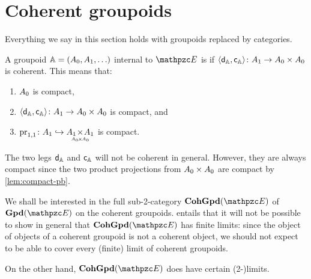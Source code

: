\documentclass[a4paper,11pt]{amsart}
\newcommand{\kpdcincat}[1]{\argpdf{#1}\hspace{-2ex}\underset{\mbox{\tiny$\obgpdf{#1}\!\!\times\!\!\obgpdf{#1}$}}{\times}\hspace{-2ex}\argpdf{#1}}
\newcommand{\Akpdcin}{\kpdcincat{A}}
\begin{document}
\section{Coherent groupoids}
\label{sec:coh-gpd}

Everything we say in this section holds with groupoids replaced by categories.

A groupoid $\mathbb{A}=({A}_0,{A}_1,\ldots)$ internal to $\Ecat$ is  if $\langle{\mathsf{d}_{\mathbb{A}},\mathsf{c}_{\mathbb{A}}}\rangle\colon {A}_1\to {A}_0\times{A}_0$ is coherent.
This means that:
\begin{enumerate}
	\item
	${A}_0$ is compact,
	\item
	$\langle{\mathsf{d}_{\mathbb{A}},\mathsf{c}_{\mathbb{A}}}\rangle\colon {A}_1\to {A}_0\times{A}_0$ is compact, and
	\item
	$\pr{1,1}\colon \Aargpdf \mono \Akpdcin$ is compact.
\end{enumerate}

The two legs $\mathsf{d}_{\mathbb{A}}$ and $\mathsf{c}_{\mathbb{A}}$ will not be coherent in general.
However, they are always compact
since the two product projections from ${A}_0 \times {A}_0$ are compact by \cref{lem:compact-pb}.

We shall be interested in the full sub-2-category $\Echgpdin$ of $\Egpdin$ on the coherent groupoids.
 entails that it will not be possible to show in general that $\Echgpdin$ has finite limits:
since the object of objects of a coherent groupoid is not a coherent object,
we should not expect to be able to cover every (finite) limit of coherent groupoids.

On the other hand, $\Echgpdin$ does have certain (2-)limits.
\end{document}
